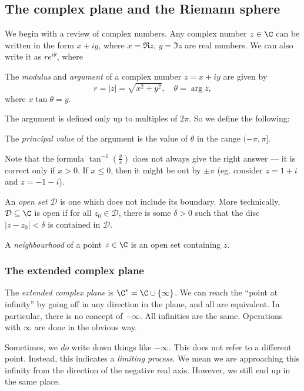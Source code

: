 \documentclass[a4paper]{article}
\begin{document}
\subsection{The complex plane and the Riemann sphere}
We begin with a review of complex numbers. Any complex number $z \in \C$ can be written in the form $x + iy$, where $x = \Re z$, $y = \Im z$ are real numbers. We can also write it as $r e^{i\theta}$, where
\begin{defi}
  The \emph{modulus} and \emph{argument} of a complex number $z = x + iy$ are given by
  \[
    r = |z| = \sqrt{x^2 + y^2}, \quad \theta = \arg z,
  \]
  where $x \tan \theta = y$.
\end{defi}
The argument is defined only up to multiples of $2\pi$. So we define the following:
\begin{defi}
  The \emph{principal value} of the argument is the value of $\theta$ in the range $(-\pi, \pi]$.
\end{defi}
Note that the formula $\tan^{-1} \left(\frac{y}{x}\right)$ does not always give the right answer --- it is correct only if $x > 0$. If $x \leq 0$, then it might be out by $\pm \pi$ (eg. consider $z = 1 + i$ and $z = -1 - i$).

\begin{defi}
  An \emph{open set} $\mathcal{D}$ is one which does not include its boundary. More technically, $\mathcal{D} \subseteq \C$ is open if for all $z_0 \in \mathcal{D}$, there is some $\delta > 0$ such that the disc $|z - z_0| < \delta$ is contained in $\mathcal{D}$.
\end{defi}

\begin{defi}[Neighbourhood]
  A \emph{neighbourhood} of a point $z \in \C$ is an open set containing $z$.
\end{defi}

\subsubsection*{The extended complex plane}
\begin{defi}
  The \emph{extended complex plane} is $\C^* = \C \cup \{\infty\}$. We can reach the ``point at infinity'' by going off in any direction in the plane, and all are equivalent. In particular, there is no concept of $-\infty$. All infinities are the same. Operations with $\infty$ are done in the obvious way.
\end{defi}
Sometimes, we \emph{do} write down things like $-\infty$. This does not refer to a different point. Instead, this indicates a \emph{limiting process}. We mean we are approaching this infinity from the direction of the negative real axis. However, we still end up in the same place.
\end{document}
